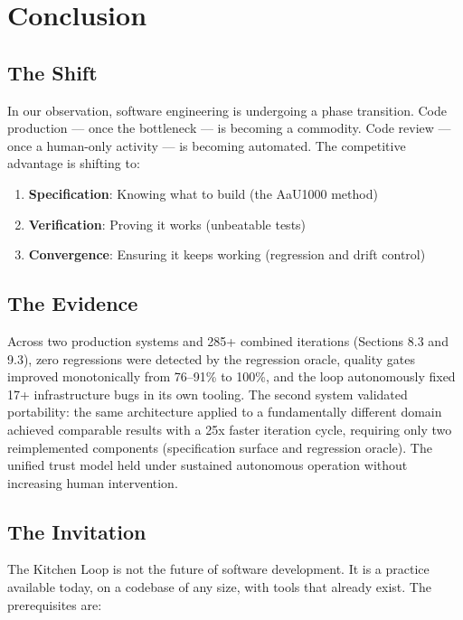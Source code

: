 \documentclass[11pt,a4paper]{article}
\providecommand{\tightlist}{%
  \setlength{\itemsep}{0pt}\setlength{\parskip}{0pt}}
\begin{document}
\section{Conclusion}\label{sec:conclusion}

\subsection{The Shift}\label{sec:shift}

In our observation, software engineering is undergoing a phase transition. Code production --- once the bottleneck --- is becoming a commodity. Code review --- once a human-only activity --- is becoming automated. The competitive advantage is shifting to:

\begin{enumerate}
\def\labelenumi{\arabic{enumi}.}
\tightlist
\item
  \textbf{Specification}: Knowing what to build (the AaU1000 method)
\item
  \textbf{Verification}: Proving it works (unbeatable tests)
\item
  \textbf{Convergence}: Ensuring it keeps working (regression and drift control)
\end{enumerate}

\subsection{The Evidence}\label{sec:evidence}

Across two production systems and 285+ combined iterations (Sections 8.3 and 9.3), zero regressions were detected by the regression oracle, quality gates improved monotonically from 76--91\% to 100\%, and the loop autonomously fixed 17+ infrastructure bugs in its own tooling. The second system validated portability: the same architecture applied to a fundamentally different domain achieved comparable results with a 25x faster iteration cycle, requiring only two reimplemented components (specification surface and regression oracle). The unified trust model held under sustained autonomous operation without increasing human intervention.

\subsection{The Invitation}\label{sec:invitation}

The Kitchen Loop is not the future of software development. It is a practice available today, on a codebase of any size, with tools that already exist. The prerequisites are:
\end{document}
